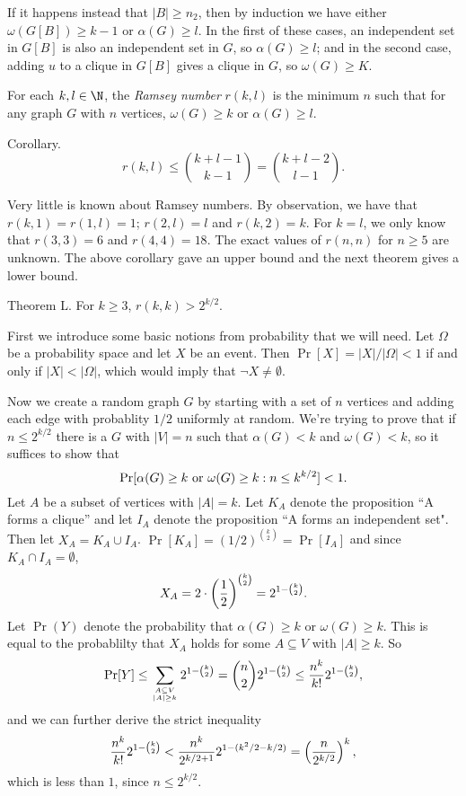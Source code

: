 If it happens instead that $|B|\geq n_2$, then by induction we have either $\omega(G[B]) \geq k-1$ or $\alpha(G)\geq l$. In the first of these cases, an independent set in $G[B]$ is also an independent set in $G$, so $\alpha(G)\geq l$; and in the second case, adding $u$ to a clique in $G[B]$ gives a clique in $G$, so $\omega(G) \geq K$. \slug

For each $k,l\in \N$, the {\it Ramsey number} $r(k,l)$ is the minimum $n$ such that for any graph $G$ with $n$ vertices, $\omega(G)\geq k$ or $\alpha(G)\geq l$.

\proclaim Corollary. $$r(k,l) \leq {k+l-1\choose k-1} = {k+l-2\choose l-1}.$$

Very little is known about Ramsey numbers. By observation, we have that $r(k,1) = r(1,l) = 1$; $r(2,l) = l$ and $r(k,2) = k$. For $k=l$, we only know that $r(3,3) = 6$ and $r(4,4) = 18$. The exact values of $r(n,n)$ for $n\geq 5$ are unknown. The above corollary gave an upper bound and the next theorem gives a lower bound.

\proclaim Theorem L. For $k\geq 3$, $r(k,k)>2^{k/2}$.

\proof First we introduce some basic notions from probability that we will need. Let $\Omega$ be a probability space and let $X$ be an event. Then $\Pr[X] = |X|/|\Omega| < 1$ if and only if $|X| < |\Omega|$, which would imply that $\neg X \neq \emptyset$.

Now we create a random graph $G$ by starting with a set of $n$ vertices and adding each edge with probablity $1/2$ uniformly at random. We're trying to prove that if $n\leq 2^{k/2}$ there is a $G$ with $|V| = n$ such that $\alpha(G) < k$ and $\omega(G) < k$, so it suffices to show that
$$\Pr[\alpha(G) \geq k\ \hbox{or}\ \omega(G)\geq k : n\leq k^{k/2}] < 1.$$
Let $A$ be a subset of vertices with $|A|=k$. Let $K_A$ denote the proposition ``A forms a clique'' and let $I_A$ denote the proposition ``A forms an independent set". Then let $X_A = K_A \cup I_A$. $\Pr[K_A] = (1/2)^{k\choose 2} = \Pr[I_A]$ and since $K_A \cap I_A = \emptyset$,
$$X_A = 2\cdot\left({1\over 2}\right)^{k\choose 2} = 2^{1-{k\choose 2}}.$$
Let $\Pr(Y)$ denote the probability that $\alpha(G) \geq k$ or $\omega(G) \geq k$. This is equal to the probablilty that $X_A$ holds for some $A\subseteq V$ with $|A|\geq k$. So
$$\Pr[Y] \leq \sum_{A\subseteq V\atop |A|\geq k} 2^{1-{k\choose 2}} = {n\choose 2}2^{1-{k\choose 2}} \leq {n^k\over k!}2^{1-{k\choose 2}},$$
and we can further derive the strict inequality
$${n^k\over k!}2^{1-{k\choose 2}} < {n^k\over {2^{k/2+1}}}2^{1-(k^2/2-k/2)} = \left({n\over 2^{k/2}}\right)^k,$$
which is less than $1$, since $n\leq 2^{k/2}$. \slug


